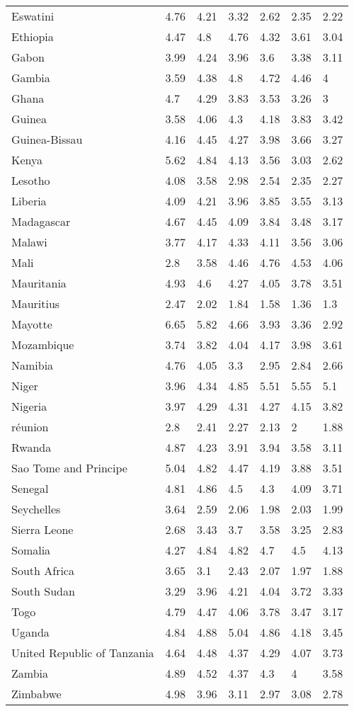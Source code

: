 \begin{longtable}[t]{lllllll}
\addlinespace
Eswatini & 4.76 & 4.21 & 3.32 & 2.62 & 2.35 & 2.22\\
Ethiopia & 4.47 & 4.8 & 4.76 & 4.32 & 3.61 & 3.04\\
Gabon & 3.99 & 4.24 & 3.96 & 3.6 & 3.38 & 3.11\\
Gambia & 3.59 & 4.38 & 4.8 & 4.72 & 4.46 & 4\\
Ghana & 4.7 & 4.29 & 3.83 & 3.53 & 3.26 & 3\\
\addlinespace
Guinea & 3.58 & 4.06 & 4.3 & 4.18 & 3.83 & 3.42\\
Guinea-Bissau & 4.16 & 4.45 & 4.27 & 3.98 & 3.66 & 3.27\\
Kenya & 5.62 & 4.84 & 4.13 & 3.56 & 3.03 & 2.62\\
Lesotho & 4.08 & 3.58 & 2.98 & 2.54 & 2.35 & 2.27\\
Liberia & 4.09 & 4.21 & 3.96 & 3.85 & 3.55 & 3.13\\
\addlinespace
Madagascar & 4.67 & 4.45 & 4.09 & 3.84 & 3.48 & 3.17\\
Malawi & 3.77 & 4.17 & 4.33 & 4.11 & 3.56 & 3.06\\
Mali & 2.8 & 3.58 & 4.46 & 4.76 & 4.53 & 4.06\\
Mauritania & 4.93 & 4.6 & 4.27 & 4.05 & 3.78 & 3.51\\
Mauritius & 2.47 & 2.02 & 1.84 & 1.58 & 1.36 & 1.3\\
\addlinespace
Mayotte & 6.65 & 5.82 & 4.66 & 3.93 & 3.36 & 2.92\\
Mozambique & 3.74 & 3.82 & 4.04 & 4.17 & 3.98 & 3.61\\
Namibia & 4.76 & 4.05 & 3.3 & 2.95 & 2.84 & 2.66\\
Niger & 3.96 & 4.34 & 4.85 & 5.51 & 5.55 & 5.1\\
Nigeria & 3.97 & 4.29 & 4.31 & 4.27 & 4.15 & 3.82\\
\addlinespace
réunion & 2.8 & 2.41 & 2.27 & 2.13 & 2 & 1.88\\
Rwanda & 4.87 & 4.23 & 3.91 & 3.94 & 3.58 & 3.11\\
Sao Tome and Principe & 5.04 & 4.82 & 4.47 & 4.19 & 3.88 & 3.51\\
Senegal & 4.81 & 4.86 & 4.5 & 4.3 & 4.09 & 3.71\\
Seychelles & 3.64 & 2.59 & 2.06 & 1.98 & 2.03 & 1.99\\
\addlinespace
Sierra Leone & 2.68 & 3.43 & 3.7 & 3.58 & 3.25 & 2.83\\
Somalia & 4.27 & 4.84 & 4.82 & 4.7 & 4.5 & 4.13\\
South Africa & 3.65 & 3.1 & 2.43 & 2.07 & 1.97 & 1.88\\
South Sudan & 3.29 & 3.96 & 4.21 & 4.04 & 3.72 & 3.33\\
Togo & 4.79 & 4.47 & 4.06 & 3.78 & 3.47 & 3.17\\
\addlinespace
Uganda & 4.84 & 4.88 & 5.04 & 4.86 & 4.18 & 3.45\\
United Republic of Tanzania & 4.64 & 4.48 & 4.37 & 4.29 & 4.07 & 3.73\\
Zambia & 4.89 & 4.52 & 4.37 & 4.3 & 4 & 3.58\\
Zimbabwe & 4.98 & 3.96 & 3.11 & 2.97 & 3.08 & 2.78\\*
\end{longtable}
\endgroup{}
